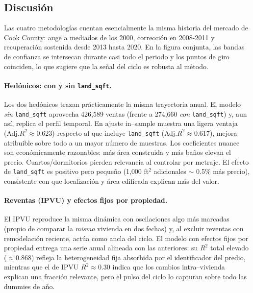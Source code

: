 \documentclass[conference]{IEEEtran}
\begin{document}
\subsection{Discusión}

Las cuatro metodologías cuentan esencialmente la misma historia del mercado de Cook County: auge a mediados de los 2000, corrección en 2008-2011 y recuperación sostenida desde 2013 hasta 2020. En la figura conjunta, las bandas de confianza se intersecan durante casi todo el periodo y los puntos de giro coinciden, lo que sugiere que la señal del ciclo es robusta al método.

\paragraph{Hedónicos: con y sin \texttt{land\_sqft}.}
Los dos hedónicos trazan prácticamente la misma trayectoria anual. El modelo \emph{sin} \texttt{land\_sqft} aprovecha 426{,}589 ventas (frente a 274{,}660 \emph{con} \texttt{land\_sqft}) y, aun así, replica el perfil temporal. En ajuste in–sample muestra una ligera ventaja (Adj.\(R^2 \approx 0.623\)) respecto al que incluye \texttt{land\_sqft} (Adj.\(R^2 \approx 0.617\)), mejora atribuible sobre todo a un mayor número de muestras. Los coeficientes nuance son económicamente razonables: más área construida y más baños elevan el precio. Cuartos/dormitorios pierden relevancia al controlar por metraje. El efecto de \texttt{land\_sqft} es positivo pero pequeño (1{,}000 ft\(^2\) adicionales \(\sim\) 0.5\% más precio), consistente con que localización y área edificada explican más del valor.

\paragraph{Reventas (IPVU) y efectos fijos por propiedad.}
El IPVU reproduce la misma dinámica con oscilaciones algo más marcadas (propio de comparar la \emph{misma} vivienda en dos fechas) y, al excluir reventas con remodelación reciente, actúa como ancla del ciclo. El modelo con efectos fijos por propiedad entrega una serie anual alineada con las anteriores: su \(R^2\) total elevado (\(\approx 0.868\)) refleja la heterogeneidad fija absorbida por el identificador del predio, mientras que el de IPVU \(R^2 \approx 0.30\) indica que los cambios intra–vivienda explican una fracción relevante, pero el pulso del ciclo lo capturan sobre todo las dummies de año.
\end{document}
